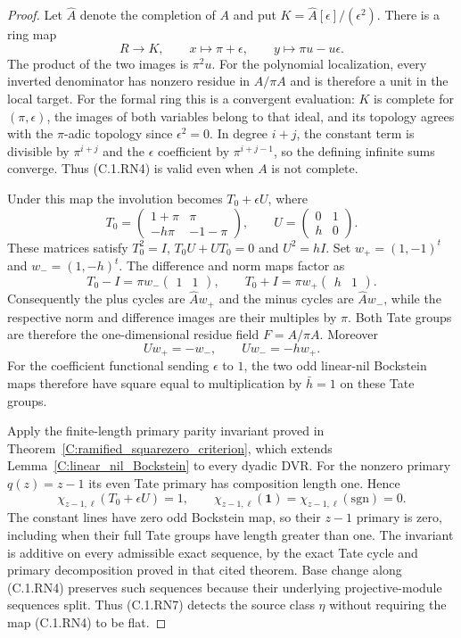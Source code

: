 \begin{proof}
Let $\widehat A$ denote the completion of $A$ and put
$K=\widehat A[\epsilon]/(\epsilon^2)$.
There is a ring map
\[
 R\longrightarrow K,\qquad
 x\longmapsto\pi+\epsilon,\qquad
 y\longmapsto\pi u-u\epsilon.                         \tag{C.1.RN4}
\]
The product of the two images is $\pi^2u$.
For the polynomial localization, every inverted denominator
has nonzero residue in $A/\pi A$ and is therefore a unit in
the local target. For the formal ring this is a convergent
evaluation: $K$ is complete for $(\pi,\epsilon)$, the images
of both variables belong to that ideal, and its topology
agrees with the $\pi$-adic topology since $\epsilon^2=0$.
In degree $i+j$, the constant term is divisible by
$\pi^{i+j}$ and the $\epsilon$ coefficient by
$\pi^{i+j-1}$, so the defining infinite sums converge.
Thus (C.1.RN4) is valid even when $A$ is not complete.

Under this map the involution becomes $T_0+\epsilon U$, where
\[
 T_0=\begin{pmatrix}1+\pi&\pi\\-h\pi&-1-\pi\end{pmatrix},
 \qquad U=\begin{pmatrix}0&1\\h&0\end{pmatrix}.         \tag{C.1.RN5}
\]
These matrices satisfy
$T_0^2=I$, $T_0U+UT_0=0$ and $U^2=hI$.
Set $w_+=(1,-1)^t$ and $w_-=(1,-h)^t$.
The difference and norm maps factor as
\[
 T_0-I=\pi w_-\begin{pmatrix}1&1\end{pmatrix},
 \qquad
 T_0+I=\pi w_+\begin{pmatrix}h&1\end{pmatrix}.
                                                               \tag{C.1.RN6}
\]
Consequently the plus cycles are $\widehat A w_+$ and
the minus cycles are $\widehat A w_-$, while the respective
norm and difference images are their multiples by $\pi$.
Both Tate groups are therefore the one-dimensional residue
field $F=A/\pi A$.
Moreover
\[
 Uw_+=-w_-,\qquad Uw_-=-h w_+.
\]
For the coefficient functional sending $\epsilon$ to $1$,
the two odd linear-nil Bockstein maps therefore have square
equal to multiplication by $\bar h=1$ on these Tate groups.

Apply the finite-length primary parity invariant proved in
Theorem~\ref{C:ramified_squarezero_criterion}, which extends
Lemma~\ref{C:linear_nil_Bockstein} to every dyadic DVR.
For the nonzero primary $q(z)=z-1$ its even Tate primary
has composition length one. Hence
\[
             \chi_{z-1,\ell}(T_0+\epsilon U)=1,
 \qquad \chi_{z-1,\ell}(\mathbf1)
       =\chi_{z-1,\ell}(\mathrm{sgn})=0.                \tag{C.1.RN7}
\]
The constant lines have zero odd Bockstein map, so their
$z-1$ primary is zero, including when their full Tate
groups have length greater than one.
The invariant is additive on every admissible exact sequence,
by the exact Tate cycle and primary decomposition proved
in that cited theorem. Base change along (C.1.RN4) preserves
such sequences because their underlying projective-module
sequences split. Thus (C.1.RN7) detects the source class
$\eta$ without requiring the map (C.1.RN4) to be flat.


\end{proof}
